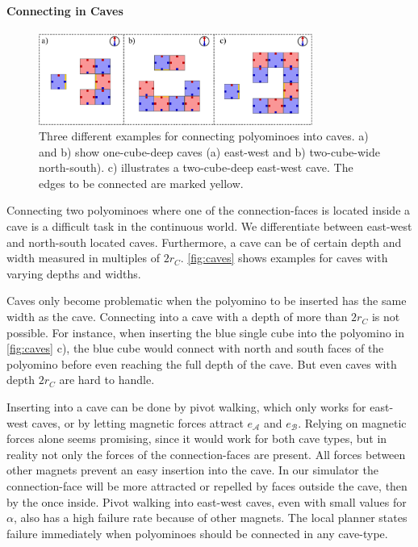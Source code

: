 \paragraph{Connecting in Caves}

\begin{figure}
	\centering
	\includegraphics[width=0.80\textwidth]{figures/caves.pdf}
	\caption[Examples for connecting polyominoes into caves]{Three different examples for connecting polyominoes into caves. a) and b) show one-cube-deep caves (a) east-west and b) two-cube-wide north-south). c) illustrates a two-cube-deep east-west cave. The edges to be connected are marked yellow.}
	\label{fig:caves}
\end{figure}

Connecting two polyominoes where one of the connection-faces is located inside a cave is a difficult task in the continuous world.
We differentiate between east-west and north-south located caves.
Furthermore, a cave can be of certain depth and width measured in multiples of $2 r_C$.
\autoref{fig:caves} shows examples for caves with varying depths and widths.

Caves only become problematic when the polyomino to be inserted has the same width as the cave.
Connecting into a cave with a depth of more than $2 r_C$ is not possible.
For instance, when inserting the blue single cube into the polyomino in \autoref{fig:caves} c), the blue cube would connect with north and south faces of the polyomino before even reaching the full depth of the cave.
But even caves with depth $2 r_C$ are hard to handle.

Inserting into a cave can be done by pivot walking, which only works for east-west caves, or by letting magnetic forces attract $e_\mathcal{A}$ and $e_\mathcal{B}$.
Relying on magnetic forces alone seems promising, since it would work for both cave types, but in reality not only the forces of the connection-faces are present.
All forces between other magnets prevent an easy insertion into the cave.
In our simulator the connection-face will be more attracted or repelled by faces outside the cave, then by the once inside.
Pivot walking into east-west caves, even with small values for $\alpha$, also has a high failure rate because of other magnets.
The local planner states failure immediately when polyominoes should be connected in any cave-type.

